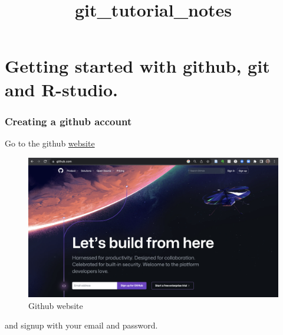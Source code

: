 \documentclass[
  letterpaper,
  DIV=11,
  numbers=noendperiod]{scrartcl}
\title{git\_tutorial\_notes}
\author{}
\date{}
\begin{document}
\maketitle
\ifdefined\Shaded\renewenvironment{Shaded}{\begin{tcolorbox}[breakable, boxrule=0pt, frame hidden, interior hidden, enhanced, sharp corners, borderline west={3pt}{0pt}{shadecolor}]}{\end{tcolorbox}}\fi

\hypertarget{getting-started-with-github-git-and-r-studio.}{%
\section{Getting started with github, git and
R-studio.}\label{getting-started-with-github-git-and-r-studio.}}

\hypertarget{creating-a-github-account}{%
\subsubsection{Creating a github
account}\label{creating-a-github-account}}

Go to the github \href{http://github.com}{website}

\begin{figure}

{\centering \includegraphics{figures/1.PNG}

}

\caption{Github website}

\end{figure}

and signup with your email and password.
\end{document}
